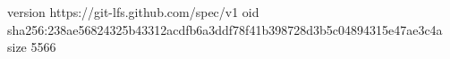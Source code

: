 version https://git-lfs.github.com/spec/v1
oid sha256:238ae56824325b43312acdfb6a3ddf78f41b398728d3b5c04894315e47ae3c4a
size 5566
